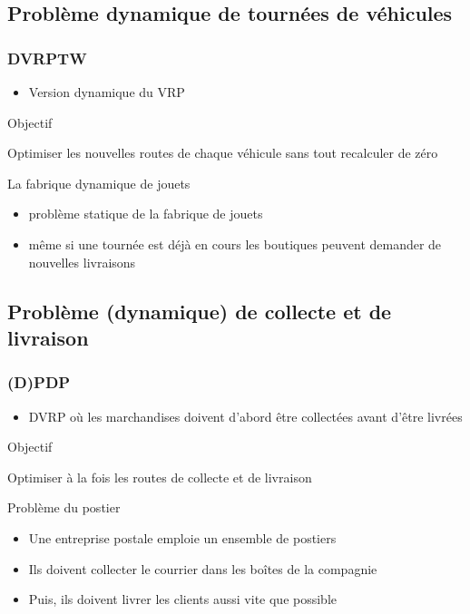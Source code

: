\documentclass{beamer}
\begin{document}
\subsection*{Problème dynamique de tournées de véhicules}
\begin{frame}
	\frametitle{DVRPTW\cite{Mitrovic01}}
	\begin{itemize}
 		\item Version dynamique du VRP
	\end{itemize}
	\begin{block}{Objectif}
		\begin{center}
			Optimiser les nouvelles routes de chaque véhicule sans tout recalculer de zéro
		\end{center}
	\end{block}	
	
	\begin{exampleblock}{La fabrique dynamique de jouets}
		\begin{itemize}
			\item problème statique de la fabrique de jouets
			\item même si une tournée est déjà en cours les boutiques peuvent demander de nouvelles livraisons
		\end{itemize}
	\end{exampleblock}
\end{frame}

\subsection*{Problème (dynamique) de collecte et de livraison}
\begin{frame}
 \frametitle{(D)PDP}
	\begin{itemize}
	 \item DVRP où les marchandises doivent d'abord être collectées avant d'être livrées
	\end{itemize}
	
	\begin{block}{Objectif}
		\begin{center}
			Optimiser à la fois les routes de collecte et de livraison
		\end{center}
	\end{block}	
	\begin{exampleblock}{Problème du postier}
		\begin{itemize}
			\item Une entreprise postale emploie un ensemble de postiers
			\item Ils doivent collecter le courrier dans les boîtes de la compagnie
			\item Puis, ils doivent livrer les clients aussi vite que possible
		\end{itemize}
	\end{exampleblock}

\end{frame}
\end{document}
